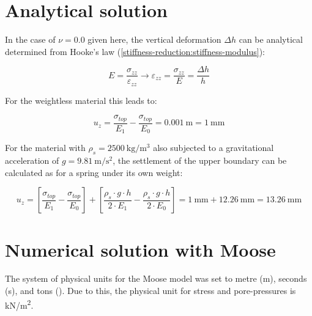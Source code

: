 
\section{Analytical solution}

In the case of $\nu = 0.0$ given here, the vertical deformation $\Delta h$ can
be analytical determined from Hooke's law
(\autoref{stiffness-reduction:stiffness-modulus}):

\begin{equation}
    \label{stiffness-reduction:stiffness-modulus}
    E = \frac{\sigma_{zz}}{\varepsilon_{zz}} \rightarrow \varepsilon_{zz}
    = \frac{\sigma_{zz}}{E} = \frac{\Delta h}{h}
\end{equation}

For the weightless material this leads to:

\begin{equation}
    u_z = \frac{\sigma_{top}}{E_1} - \frac{\sigma_{top}}{E_0} = \SI{0.001}{\metre} = \SI{1}{\milli\metre}
\end{equation}

For the material with $\rho_s = \qty[per-mode
        =symbol]{2500}{\kilogram\per\cubic\metre}$ also subjected to a gravitational
acceleration of $g = \qty[per-mode = symbol]{9.81}{\metre\per\square\second}$,
the settlement of the upper boundary can be calculated as for a spring under
its own weight:

\begin{equation}
    u_z = \left[ \frac{\sigma_{top}}{E_1} - \frac{\sigma_{top}}{E_0} \right] + \left[\frac{\rho_s \cdot g \cdot h}{2 \cdot E_1} - \frac{\rho_s \cdot g \cdot h}{2 \cdot E_0} \right] = \qty{1}{\milli\metre} + \qty{12.26}{\milli\metre} = \qty{13.26}{\milli\metre}
\end{equation}

\section{Numerical solution with Moose}

The system of physical units for the Moose model was set to metre
(\unit{\metre}), seconds (\unit{\second}), and tons (\unit{\ton}). Due to this,
the physical unit for stress and pore-pressures is \unit[per-mode =
    symbol]{\kilo\newton\per\square\metre}.

